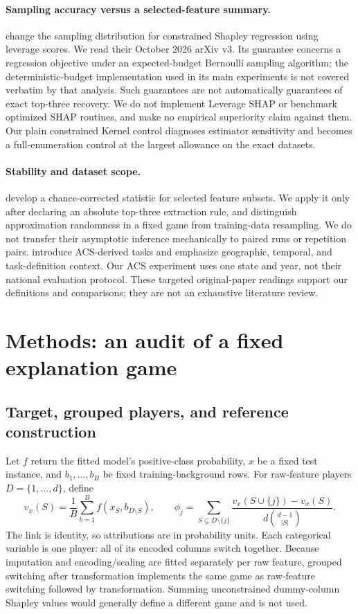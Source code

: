 \documentclass{article}
\begin{document}
\paragraph{Sampling accuracy versus a selected-feature summary.}
\citet{musco2025leverage} change the sampling distribution for constrained Shapley regression using leverage scores. We read their October 2026 arXiv v3. Its guarantee concerns a regression objective under an expected-budget Bernoulli sampling algorithm; the deterministic-budget implementation used in its main experiments is not covered verbatim by that analysis. Such guarantees are not automatically guarantees of exact top-three recovery. We do not implement Leverage SHAP or benchmark optimized SHAP routines, and make no empirical superiority claim against them. Our plain constrained Kernel control diagnoses estimator sensitivity and becomes a full-enumeration control at the largest allowance on the exact datasets.

\paragraph{Stability and dataset scope.}
\citet{nogueira2018stability} develop a chance-corrected statistic for selected feature subsets. We apply it only after declaring an absolute top-three extraction rule, and distinguish approximation randomness in a fixed game from training-data resampling. We do not transfer their asymptotic inference mechanically to paired runs or repetition pairs. \citet{ding2022retiring} introduce ACS-derived tasks and emphasize geographic, temporal, and task-definition context. Our ACS experiment uses one state and year, not their national evaluation protocol. These targeted original-paper readings support our definitions and comparisons; they are not an exhaustive literature review.

\section{Methods: an audit of a fixed explanation game}
\label{sec:methods}
\subsection{Target, grouped players, and reference construction}
Let $f$ return the fitted model's positive-class probability, $x$ be a fixed test instance, and $b_1,\ldots,b_B$ be fixed training-background rows. For raw-feature players $D=\{1,\ldots,d\}$, define
\begin{equation}
 v_x(S)=\frac{1}{B}\sum_{b=1}^{B} f(x_S,b_{D\setminus S}),\qquad
 \phi_j=\sum_{S\subseteq D\setminus\{j\}}
 \frac{v_x(S\cup\{j\})-v_x(S)}{d\binom{d-1}{|S|}}.
 \label{eq:game}
\end{equation}
The link is identity, so attributions are in probability units. Each categorical variable is one player: all of its encoded columns switch together. Because imputation and encoding/scaling are fitted separately per raw feature, grouped switching after transformation implements the same game as raw-feature switching followed by transformation. Summing unconstrained dummy-column Shapley values would generally define a different game and is not used.
\end{document}
